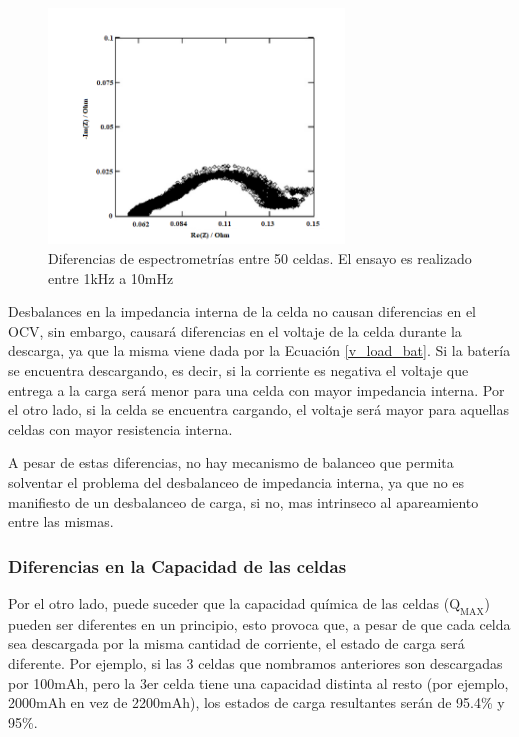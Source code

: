 \documentclass[10pt,a4paper]{article}
\begin{document}
	\begin{figure}[h!]
		\begin{center}
			\includegraphics[width=0.7\textwidth]{zin_diff.png}
			\caption{Diferencias de espectrometrías entre 50 celdas. 
                     El ensayo es realizado entre 1kHz a 10mHz}
			\label{zin_diff}
		\end{center}
	\end{figure}
	
	\noindent Desbalances en la impedancia interna de la celda no causan 
    diferencias en el OCV, sin embargo, causará diferencias en el voltaje de la 
    celda durante la descarga, ya que la misma viene dada por la Ecuación 
    \ref{v_load_bat}. Si la batería se encuentra descargando, es decir, si 
    la corriente es negativa el voltaje que entrega a la carga será menor para 
    una celda con mayor impedancia interna. Por el otro lado, si la celda se 
    encuentra cargando, el voltaje será mayor para aquellas celdas con mayor 
    resistencia interna.
	
    \noindent A pesar de estas diferencias, no hay mecanismo de balanceo que 
    permita solventar el problema del desbalanceo de impedancia interna, ya que 
    no es manifiesto de un desbalanceo de carga, si no, mas intrinseco al 
    apareamiento entre las mismas.
	
	\subsubsection{Diferencias en la Capacidad de las celdas}
	
	Por el otro lado, puede suceder que la capacidad química de las celdas 
    ($\mathrm{Q_{MAX}}$) pueden ser diferentes en un principio, esto provoca 
    que, a pesar de que cada celda sea descargada por la misma cantidad de 
    corriente, el estado de carga será diferente. Por ejemplo, si las 3 celdas 
    que nombramos anteriores son descargadas por 100mAh, pero la 3er celda 
    tiene una capacidad distinta al resto (por ejemplo, 2000mAh en vez de 
    2200mAh), los estados de carga resultantes serán de 95.4\% y 95\%.
	
\end{document}
